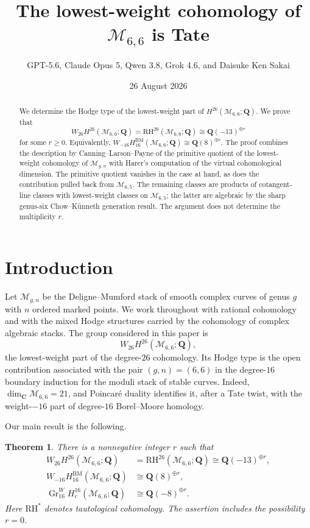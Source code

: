 \documentclass[11pt,reqno]{amsart}
\title[The lowest-weight cohomology of $\M_{6,6}$]
  {The lowest-weight cohomology of $\mathcal{M}_{6,6}$ is Tate}
\author{GPT-5.6, Claude Opus 5, Qwen 3.8, Grok 4.6, and Daisuke Ken Sakai}
\date{26 August 2026}
\newcommand{\Q}{\mathbf{Q}}
\newcommand{\M}{\mathcal{M}}
\newcommand{\BM}{\mathrm{BM}}
\newcommand{\RH}{\mathrm{RH}}
\newcommand{\Gr}{\operatorname{Gr}}
\newtheorem{theorem}{Theorem}[section]
\theoremstyle{definition}
\theoremstyle{remark}
\begin{document}
\begin{abstract}
We determine the Hodge type of the lowest-weight part of
$H^{26}(\M_{6,6};\Q)$.  We prove that
\[
  W_{26}H^{26}(\M_{6,6};\Q)
  =\RH^{26}(\M_{6,6};\Q)
  \cong \Q(-13)^{\oplus r}
\]
for some $r\geq 0$.  Equivalently,
$W_{-16}H^{\BM}_{16}(\M_{6,6};\Q)\cong\Q(8)^{\oplus r}$.
The proof combines the description by Canning--Larson--Payne of the
primitive quotient of the lowest-weight cohomology of $\M_{g,n}$ with
Harer's computation of the virtual cohomological dimension.  The primitive
quotient vanishes in the case at hand, as does the contribution pulled back
from $\M_{6,5}$.  The remaining classes are products of cotangent-line
classes with lowest-weight classes on $\M_{6,5}$; the latter are algebraic by
the sharp genus-six Chow--K\"unneth generation result.  The argument does not
determine the multiplicity $r$.
\end{abstract}

\maketitle

\section{Introduction}

Let $\M_{g,n}$ be the Deligne--Mumford stack of smooth complex curves of
genus $g$ with $n$ ordered marked points.  We work throughout with rational
cohomology and with the mixed Hodge structures carried by the cohomology of
complex algebraic stacks.  The group considered in this paper is
\[
  W_{26}H^{26}(\M_{6,6};\Q),
\]
the lowest-weight part of the degree-$26$ cohomology.  Its Hodge type is the
open contribution associated with the pair $(g,n)=(6,6)$ in the degree-$16$
boundary induction for the moduli stack of stable curves.  Indeed,
$\dim_{\mathbf C}\M_{6,6}=21$, and Poincar\'e duality identifies it, after a
Tate twist, with the weight-$-16$ part of degree-$16$ Borel--Moore homology.

Our main result is the following.

\begin{theorem}\label{thm:main}
There is a nonnegative integer $r$ such that
\begin{align*}
  W_{26}H^{26}(\M_{6,6};\Q)
    &=\RH^{26}(\M_{6,6};\Q)
      \cong \Q(-13)^{\oplus r},\\
  W_{-16}H^{\BM}_{16}(\M_{6,6};\Q)
    &\cong \Q(8)^{\oplus r},\\
  \Gr^{W}_{16}H^{16}_c(\M_{6,6};\Q)
    &\cong \Q(-8)^{\oplus r}.
\end{align*}
Here $\RH^*$ denotes tautological cohomology.  The assertion includes the
possibility $r=0$.
\end{theorem}
\end{document}
